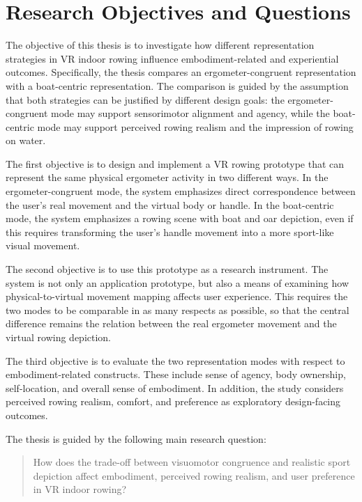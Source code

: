 \section{Research Objectives and Questions}
\label{sec:introduction_research_objectives}

The objective of this thesis is to investigate how different representation strategies in VR indoor rowing influence embodiment-related and experiential outcomes. Specifically, the thesis compares an ergometer-congruent representation with a boat-centric representation. The comparison is guided by the assumption that both strategies can be justified by different design goals: the ergometer-congruent mode may support sensorimotor alignment and agency, while the boat-centric mode may support perceived rowing realism and the impression of rowing on water.

The first objective is to design and implement a VR rowing prototype that can represent the same physical ergometer activity in two different ways. In the ergometer-congruent mode, the system emphasizes direct correspondence between the user's real movement and the virtual body or handle. In the boat-centric mode, the system emphasizes a rowing scene with boat and oar depiction, even if this requires transforming the user's handle movement into a more sport-like visual movement.

The second objective is to use this prototype as a research instrument. The system is not only an application prototype, but also a means of examining how physical-to-virtual movement mapping affects user experience. This requires the two modes to be comparable in as many respects as possible, so that the central difference remains the relation between the real ergometer movement and the virtual rowing depiction.

The third objective is to evaluate the two representation modes with respect to embodiment-related constructs. These include sense of agency, body ownership, self-location, and overall sense of embodiment. In addition, the study considers perceived rowing realism, comfort, and preference as exploratory design-facing outcomes.

The thesis is guided by the following main research question:

\begin{quote}
How does the trade-off between visuomotor congruence and realistic sport depiction affect embodiment, perceived rowing realism, and user preference in VR indoor rowing?
\end{quote}


